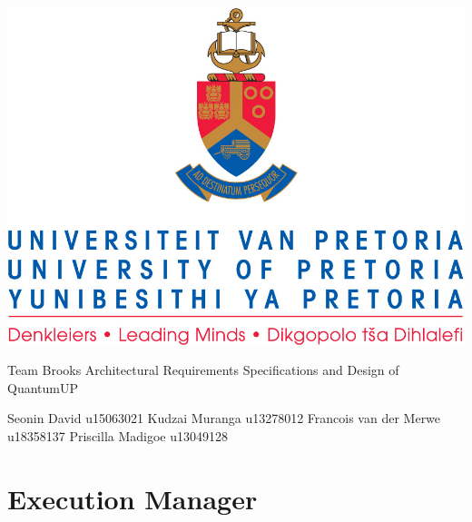 \documentclass[]{article}
\begin{document}
\selectfont
	\begin{center}\thispagestyle{empty}
		\includegraphics{uplogo.jpg}
		
		{\Huge 
			Team Brooks \linebreak
			Architectural Requirements Specifications and Design of QuantumUP \linebreak 
			\par}
		 
        
        \begin{LARGE}
            Seonin David u15063021
            \linebreak
            \linebreak
            Kudzai Muranga u13278012
            \linebreak
            \linebreak
            Francois van der Merwe u18358137
            \linebreak
            \linebreak
            Priscilla Madigoe u13049128
            \linebreak
            \linebreak
           
        \end{LARGE}
    \end{center}
    
    \newpage
	\tableofcontents
	\newpage
	\clearpage
	
    \section{Execution Manager}
    
    \newpage
    
\end{document}
